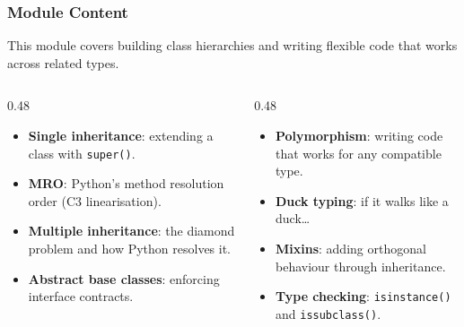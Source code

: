 \documentclass[aspectratio=169,10pt]{beamer}
\newcommand{\keyword}[1]{\textcolor{PrimaryBlue}{\textbf{#1}}}
\newcommand{\codeword}[1]{\texttt{#1}}
\begin{document}
\begin{frame}
\frametitle{Module Content}
\small
This module covers building class hierarchies and writing flexible code that works across related types.

\vspace{0.16cm}
\begin{columns}[T,totalwidth=0.96\textwidth]
\begin{column}{0.48\textwidth}
\begin{itemize}\setlength\itemsep{0.08cm}
  \item \keyword{Single inheritance}: extending a class with \codeword{super()}.
  \item \keyword{MRO}: Python's method resolution order (C3 linearisation).
  \item \keyword{Multiple inheritance}: the diamond problem and how Python resolves it.
  \item \keyword{Abstract base classes}: enforcing interface contracts.
\end{itemize}
\end{column}
\begin{column}{0.48\textwidth}
\begin{itemize}\setlength\itemsep{0.08cm}
  \item \keyword{Polymorphism}: writing code that works for any compatible type.
  \item \keyword{Duck typing}: if it walks like a duck\ldots
  \item \keyword{Mixins}: adding orthogonal behaviour through inheritance.
  \item \keyword{Type checking}: \codeword{isinstance()} and \codeword{issubclass()}.
\end{itemize}
\end{column}
\end{columns}
\end{frame}
\end{document}
